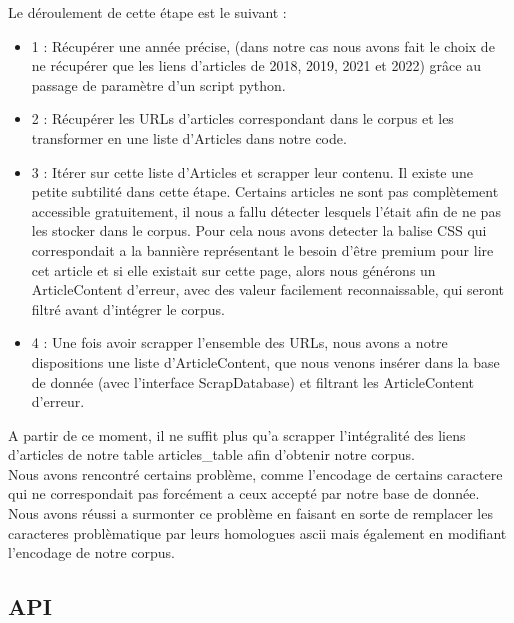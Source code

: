 \documentclass[french,12pt]{article}
\begin{document}
Le déroulement de cette étape est le suivant : \\

\begin{itemize}
    \item 1 : Récupérer une année précise, (dans notre cas nous avons fait le choix de ne récupérer que les liens d'articles de 2018, 2019, 2021 et 2022) grâce au passage de paramètre d'un script python.\\

    \item 2 : Récupérer les URLs d'articles correspondant dans le corpus et les transformer en une liste d'Articles dans notre code.\\

    \item 3 : Itérer sur cette liste d'Articles et scrapper leur contenu. Il existe une petite subtilité dans cette étape. Certains articles ne sont pas complètement accessible gratuitement, il nous a fallu détecter lesquels l'était afin de ne pas les stocker dans le corpus. Pour cela nous avons detecter la balise CSS qui correspondait a la bannière représentant le besoin d'être premium pour lire cet article et si elle existait sur cette page, alors nous générons un ArticleContent d'erreur, avec des valeur facilement reconnaissable, qui seront filtré avant d'intégrer le corpus.\\

    \item 4 : Une fois avoir scrapper l'ensemble des URLs, nous avons a notre dispositions une liste d'ArticleContent, que nous venons insérer dans la base de donnée (avec l'interface ScrapDatabase) et filtrant les ArticleContent d'erreur.\\
\end{itemize}

A partir de ce moment, il ne suffit plus qu'a scrapper l'intégralité des liens d'articles de notre table articles\_table afin d'obtenir notre corpus.\\

Nous avons rencontré certains problème, comme l'encodage de certains caractere qui ne correspondait pas forcément a ceux accepté par notre base de donnée. Nous avons réussi a surmonter ce problème en faisant en sorte de remplacer les caracteres problèmatique par leurs homologues ascii mais également en modifiant l'encodage de notre corpus.\\


\subsection{API}
\end{document}
